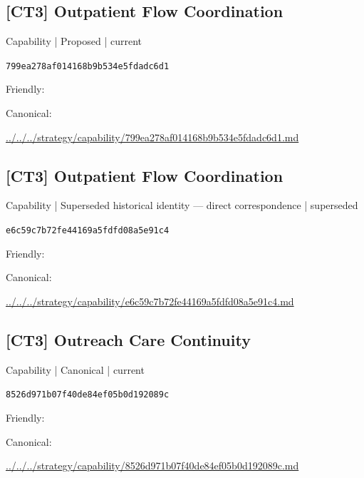 \documentclass[10pt,a4paper]{article}
\begin{document}
\subsection*{[CT3] Outpatient Flow Coordination}
{\small Capability | Proposed | current}\par
\texttt{799ea278af014168b9b534e5fdadc6d1}\par
Friendly: \par
Canonical: \par
{\footnotesize\url{../../../strategy/capability/799ea278af014168b9b534e5fdadc6d1.md}}\par
\subsection*{[CT3] Outpatient Flow Coordination}
{\small Capability | Superseded historical identity — direct correspondence | superseded}\par
\texttt{e6c59c7b72fe44169a5fdfd08a5e91c4}\par
Friendly: \par
Canonical: \par
{\footnotesize\url{../../../strategy/capability/e6c59c7b72fe44169a5fdfd08a5e91c4.md}}\par
\subsection*{[CT3] Outreach Care Continuity}
{\small Capability | Canonical | current}\par
\texttt{8526d971b07f40de84ef05b0d192089c}\par
Friendly: \par
Canonical: \par
{\footnotesize\url{../../../strategy/capability/8526d971b07f40de84ef05b0d192089c.md}}\par
\end{document}
